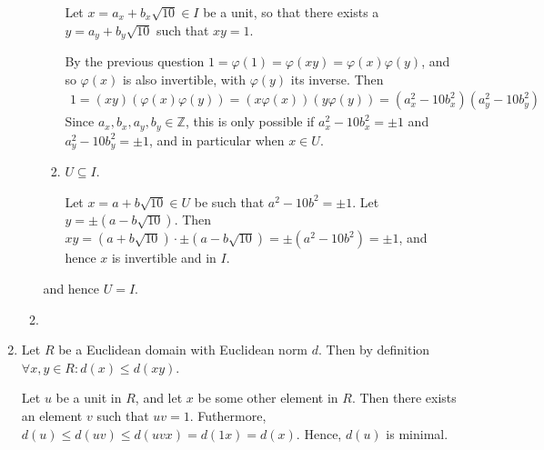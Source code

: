 \documentclass[11pt]{article} \usepackage{amssymb}
\newcommand{\Z}{\mathbb Z} \newcommand{\CalE}{{\mathcal{E}}}
\renewcommand{\phi}{\varphi}
\begin{document}
\begin{enumerate}
\begin{enumerate}
\begin{enumerate}
            Let $x=a_x+b_x\sqrt{10}\in I$ be a unit, so that there 
            exists a $y=a_y+b_y\sqrt{10}$ such that $xy=1$. 

            By the previous question $1=\phi(1)=\phi(xy)=\phi(x)\phi(y)$, and 
            so $\phi(x)$ is also invertible, with $\phi(y)$ its inverse. Then
            \begin{eqnarray*}
              1=(xy)(\phi(x)\phi(y))=(x\phi(x))(y\phi(y))
              =(a_x^2-10b_x^2)(a_y^2-10b_y^2)
            \end{eqnarray*}
            Since $a_x,b_x,a_y,b_y\in\Z$, this is only possible if 
            $a_x^2-10b_x^2=\pm 1$ and $a_y^2-10b_y^2=\pm 1$, and in particular when $x\in U$.
          \item $U \subseteq I$.

            Let $x=a+b\sqrt{10}\in U$ 
            be such that $a^2-10b^2=\pm1$. Let $y=\pm (a- b\sqrt{10})$. Then
            $xy=(a+b\sqrt{10})\cdot\pm(a- b\sqrt{10})=
            \pm (a^2- 10b^2)=\pm 1$, and hence
            $x$ is invertible and in $I$.
          \end{enumerate}
          and hence $U=I$.  
        \item 
    \end{enumerate}
  \item Let $R$ be a Euclidean domain with Euclidean norm $d$. Then by
    definition $\forall x,y\in R:d(x)\leq d(xy)$. 

    Let $u$
    be a unit in $R$, and let $x$ be some other element in $R$. Then
    there exists an element $v$ such that $uv=1$. Futhermore, 
    $d(u)\leq d(uv) \leq d(uvx) = d(1x) = d(x)$. Hence, $d(u)$ is minimal.
    
      
\end{enumerate}
\end{document}
